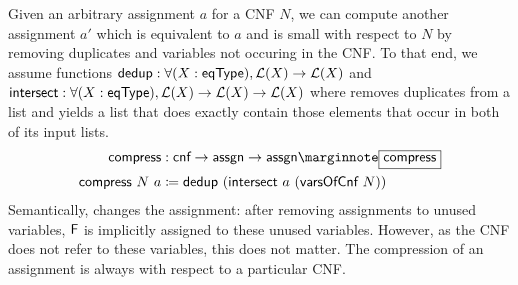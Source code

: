 Given an arbitrary assignment $a$ for a CNF $N$, we can compute another assignment $a'$ which is equivalent to $a$ and is small with respect to $N$ by removing duplicates and variables not occuring in the CNF.
\mnote{\dedup}
To that end, we assume functions $\textsf{dedup} : \forall (X : \textsf{eqType}), \mathcal{L} (X) \rightarrow \mathcal{L} (X)$ and $\textsf{intersect} : \forall (X : \textsf{eqType}), \mathcal{L} (X) \rightarrow \mathcal{L} (X) \rightarrow \mathcal{L} (X)$ where \dedup{} removes duplicates from a list and \mnotec{\intersect} yields a list that does exactly contain those elements that occur in both of its input lists.
\begin{align*}
  \compressA &: \cnf \rightarrow \assgn \rightarrow \assgn\mnote{\compressA}\\
  \compressA~N~a &\defeq \dedup~(\intersect~a~(\varsOfCnf~N))
\end{align*}
Semantically, \compressA{} changes the assignment: after removing assignments to unused variables, $\mathsf{F}$ is implicitly assigned to these unused variables. However, as the CNF does not refer to these variables, this does not matter. The compression of an assignment is always with respect to a particular CNF.



